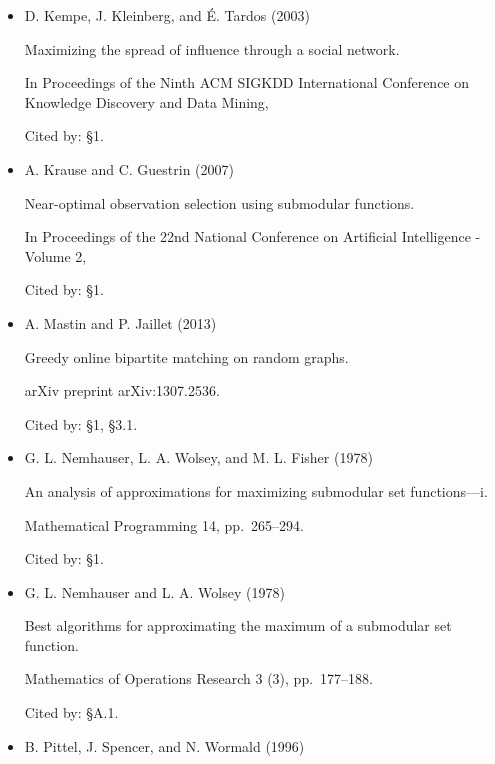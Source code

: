 \documentclass[10pt,a4paper]{article}
\begin{document}
\begin{itemize}
Reducibility among combinatorial problems.

Complexity of Computer Computations, pp. 85–103.

Cited by: §1.



\item[] [18]
D. Kempe, J. Kleinberg, and É. Tardos (2003)

Maximizing the spread of influence through a social network.

In Proceedings of the Ninth ACM SIGKDD International Conference on Knowledge Discovery and Data Mining,

Cited by: §1.



\item[] [19]
A. Krause and C. Guestrin (2007)

Near-optimal observation selection using submodular functions.

In Proceedings of the 22nd National Conference on Artificial Intelligence - Volume 2,

Cited by: §1.



\item[] [20]
A. Mastin and P. Jaillet (2013)

Greedy online bipartite matching on random graphs.

arXiv preprint arXiv:1307.2536.

Cited by: §1,
§3.1.



\item[] [21]
G. L. Nemhauser, L. A. Wolsey, and M. L. Fisher (1978)

An analysis of approximations for maximizing submodular set functions—i.

Mathematical Programming 14, pp. 265–294.

Cited by: §1.



\item[] [22]
G. L. Nemhauser and L. A. Wolsey (1978)

Best algorithms for approximating the maximum of a submodular set function.

Mathematics of Operations Research 3 (3), pp. 177–188.

Cited by: §A.1.



\item[] [23]
B. Pittel, J. Spencer, and N. Wormald (1996)


\end{itemize}
\end{document}
